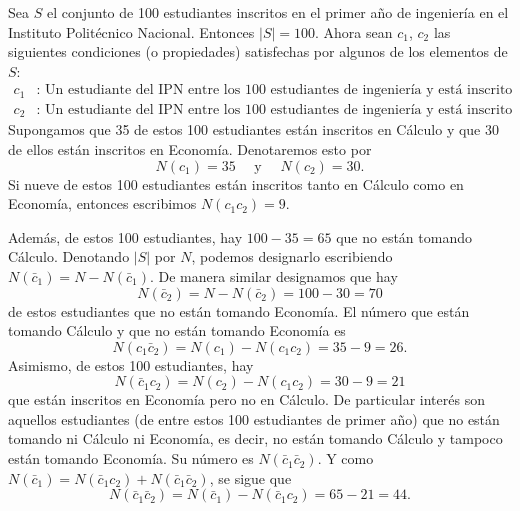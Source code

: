 \begin{myexample}
    Sea $S$ el conjunto de 100 estudiantes inscritos en el primer año de ingeniería en el Instituto Politécnico Nacional. Entonces $|S| = 100$. Ahora sean $c_1$, $c_2$ las siguientes condiciones (o propiedades) satisfechas por algunos de los elementos de $S$:
    \begin{align*}
        c_1 &: \text{ Un estudiante del IPN entre los 100 estudiantes de ingeniería y está inscrito en Cálculo.} \\
        c_2 &: \text{ Un estudiante del IPN entre los 100 estudiantes de ingeniería y está inscrito en Economía.}
    \end{align*}
    Supongamos que 35 de estos 100 estudiantes están inscritos en Cálculo y que 30 de ellos están inscritos en Economía. Denotaremos esto por
    $$N(c_1) = 35 \quad \text{ y } \quad N(c_2) = 30.$$
    Si nueve de estos 100 estudiantes están inscritos tanto en Cálculo como en Economía, entonces escribimos $N(c_1 c_2) = 9$.

    Además, de estos 100 estudiantes, hay $100 - 35 = 65$ que no están tomando Cálculo. Denotando $|S|$ por $N$, podemos designarlo escribiendo $N(\bar{c}_1) = N - N(\bar{c}_1)$. De manera similar designamos que hay
    $$N(\bar{c}_2) = N - N(\bar{c}_2) = 100 - 30 = 70$$
    de estos estudiantes que no están tomando Economía. El número que están tomando Cálculo y que no están tomando Economía es
    $$N(c_1 \bar{c}_2) = N(c_1) - N(c_1 c_2) = 35 - 9 = 26.$$
    Asimismo, de estos 100 estudiantes, hay
    $$N(\bar{c}_1 c_2) = N(c_2) - N(c_1 c_2) = 30 - 9 = 21$$
    que están inscritos en Economía pero no en Cálculo. De particular interés son aquellos estudiantes (de entre estos 100 estudiantes de primer año) que no están tomando ni Cálculo ni Economía, es decir, no están tomando Cálculo y tampoco están tomando Economía. Su número es $N(\bar{c}_1 \bar{c}_2)$. Y como $N(\bar{c}_1) = N(\bar{c}_1 c_2) + N(\bar{c}_1 \bar{c}_2)$, se sigue que
    $$N(\bar{c}_1 \bar{c}_2) = N(\bar{c}_1) - N(\bar{c}_1 c_2) = 65 - 21 = 44.$$
    

\end{myexample}
